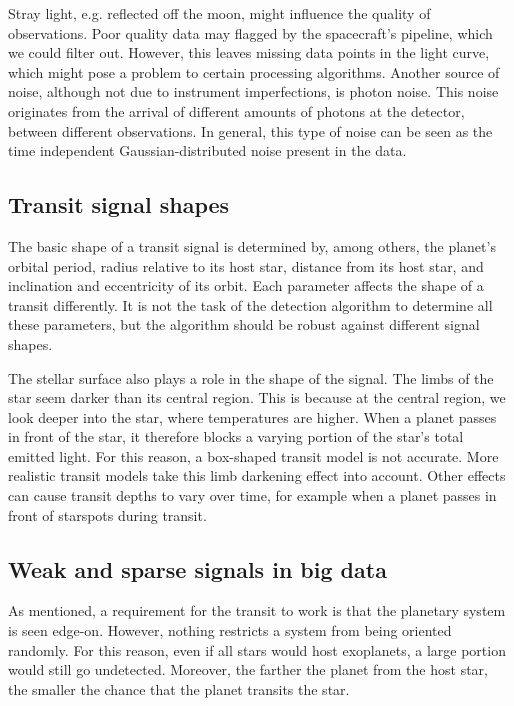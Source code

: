 Stray light, e.g. reflected off the moon, might influence the quality of observations. Poor quality data may flagged by the spacecraft’s pipeline, which we could filter out. However, this leaves missing data points in the light curve, which might pose a problem to certain processing algorithms. 
Another source of noise, although not due to instrument imperfections, is photon noise. This noise originates from the arrival of different amounts of photons at the detector, between different observations. In general, this type of noise can be seen as the time independent Gaussian-distributed noise present in the data.

\subsection{Transit signal shapes}

The basic shape of a transit signal is determined by, among others, the planet’s orbital period, radius relative to its host star, distance from its host star, and inclination and eccentricity of its orbit. Each parameter affects the shape of a transit differently. It is not the task of the detection algorithm to determine all these parameters, but the algorithm should be robust against different signal shapes.

The stellar surface also plays a role in the shape of the signal. The limbs of the star seem darker than its central region. This is because at the central region, we look deeper into the star, where temperatures are higher. When a planet passes in front of the star, it therefore blocks a varying portion of the star’s total emitted light. For this reason, a box-shaped transit model is not accurate. More realistic transit models take this limb darkening effect into account. Other effects can cause transit depths to vary over time, for example when a planet passes in front of starspots during transit.

\subsection{Weak and sparse signals in big data}

As mentioned, a requirement for the transit to work is that the planetary system is seen edge-on. However, nothing restricts a system from being oriented randomly. For this reason, even if all stars would host exoplanets, a large portion would still go undetected. Moreover, the farther the planet from the host star, the smaller the chance that the planet transits the star. 

